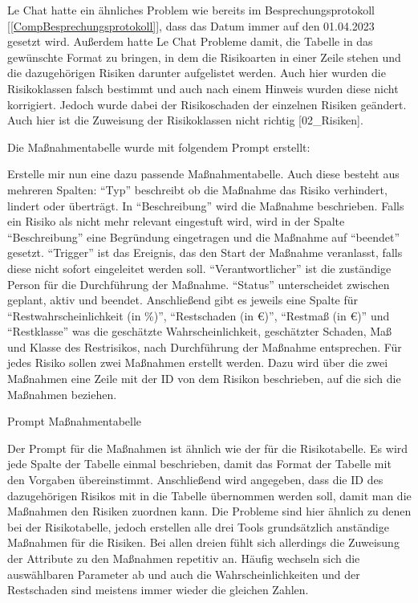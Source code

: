 Le Chat hatte ein ähnliches Problem wie bereits im Besprechungsprotokoll [\autoref{CompBesprechungsprotokoll}], dass das 
Datum immer auf den 01.04.2023 gesetzt wird. Außerdem hatte Le Chat Probleme damit, die Tabelle in das gewünschte Format
zu bringen, in dem die Risikoarten in einer Zeile stehen und die dazugehörigen Risiken darunter aufgelistet werden. Auch 
hier wurden die Risikoklassen falsch bestimmt und auch nach einem Hinweis wurden diese nicht korrigiert. Jedoch wurde 
dabei der Risikoschaden der einzelnen Risiken geändert. Auch hier ist die Zuweisung der Risikoklassen nicht richtig [02\_Risiken].

Die Maßnahmentabelle wurde mit folgendem Prompt erstellt:

\begin{prompt}[H]
    \begin{tcolorbox}[colback=gray!20, colframe=gray!20, boxrule=0pt, sharp corners] 
        Erstelle mir nun eine dazu passende Maßnahmentabelle. Auch diese besteht aus mehreren Spalten: ``Typ'' beschreibt 
        ob die Maßnahme das Risiko verhindert, lindert oder überträgt. In ``Beschreibung'' wird die Maßnahme beschrieben. 
        Falls ein Risiko als nicht mehr relevant eingestuft wird, wird in der Spalte ``Beschreibung'' eine Begründung 
        eingetragen und die Maßnahme auf ``beendet'' gesetzt. ``Trigger'' ist das Ereignis, das den Start der Maßnahme 
        veranlasst, falls diese nicht sofort eingeleitet werden soll. ``Verantwortlicher'' ist die zuständige Person für 
        die Durchführung der Maßnahme. ``Status'' unterscheidet zwischen geplant, aktiv und beendet. Anschließend gibt es 
        jeweils eine Spalte für ``Restwahrscheinlichkeit (in \%)'', ``Restschaden (in €)'', ``Restmaß (in €)'' und ``Restklasse'' 
        was die geschätzte Wahrscheinlichkeit, geschätzter Schaden, Maß und Klasse des Restrisikos, nach Durchführung der 
        Maßnahme entsprechen. Für jedes Risiko sollen zwei Maßnahmen erstellt werden. Dazu wird über die zwei Maßnahmen 
        eine Zeile mit der ID von dem Risikon beschrieben, auf die sich die Maßnahmen beziehen.
        \vfill
    \end{tcolorbox}
    \caption{Prompt Maßnahmentabelle}
    \label{Prompt Maßnahmentabelle}
\end{prompt}

Der Prompt für die Maßnahmen ist ähnlich wie der für die Risikotabelle. Es wird jede Spalte der Tabelle einmal beschrieben,
damit das Format der Tabelle mit den Vorgaben übereinstimmt. Anschließend wird angegeben, dass die ID des dazugehörigen Risikos
mit in die Tabelle übernommen werden soll, damit man die Maßnahmen den Risiken zuordnen kann. Die Probleme sind hier 
ähnlich zu denen bei der Risikotabelle, jedoch erstellen alle drei Tools grundsätzlich anständige Maßnahmen für die Risiken.
Bei allen dreien fühlt sich allerdings die Zuweisung der Attribute zu den Maßnahmen repetitiv an. Häufig wechseln sich die 
auswählbaren Parameter ab und auch die Wahrscheinlichkeiten und der Restschaden sind meistens immer wieder die gleichen Zahlen.

